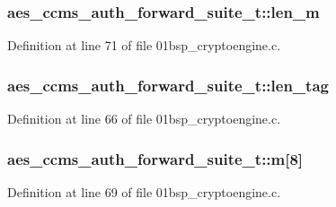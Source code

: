 \subsubsection[{\texorpdfstring{len\+\_\+m}{len_m}}]{ aes\+\_\+ccms\+\_\+auth\+\_\+forward\+\_\+suite\+\_\+t\+::len\+\_\+m}\hypertarget{structaes__ccms__auth__forward__suite__t_aad1b00075b02f5d48ba243f19eaa5d7c}{}\label{structaes__ccms__auth__forward__suite__t_aad1b00075b02f5d48ba243f19eaa5d7c}


Definition at line 71 of file 01bsp\+\_\+cryptoengine.\+c.

\subsubsection[{\texorpdfstring{len\+\_\+tag}{len_tag}}]{ aes\+\_\+ccms\+\_\+auth\+\_\+forward\+\_\+suite\+\_\+t\+::len\+\_\+tag}\hypertarget{structaes__ccms__auth__forward__suite__t_aa2c4b87795a4d73e649721442713d1e8}{}\label{structaes__ccms__auth__forward__suite__t_aa2c4b87795a4d73e649721442713d1e8}


Definition at line 66 of file 01bsp\+\_\+cryptoengine.\+c.

\subsubsection[{\texorpdfstring{m}{m}}]{ aes\+\_\+ccms\+\_\+auth\+\_\+forward\+\_\+suite\+\_\+t\+::m\mbox{[}8\mbox{]}}\hypertarget{structaes__ccms__auth__forward__suite__t_a3546394facafa867e6bf1993cc6cf8ba}{}\label{structaes__ccms__auth__forward__suite__t_a3546394facafa867e6bf1993cc6cf8ba}


Definition at line 69 of file 01bsp\+\_\+cryptoengine.\+c.

